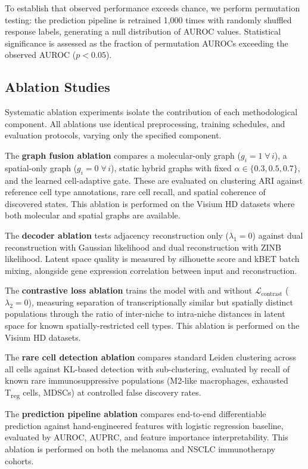 \documentclass{article}
\begin{document}
To establish that observed performance exceeds chance, we perform permutation testing: the prediction pipeline is retrained 1{,}000 times with randomly shuffled response labels, generating a null distribution of AUROC values. Statistical significance is assessed as the fraction of permutation AUROCs exceeding the observed AUROC ($p < 0.05$).


\subsection{Ablation Studies}
\label{sec:ablations}

Systematic ablation experiments isolate the contribution of each methodological component. All ablations use identical preprocessing, training schedules, and evaluation protocols, varying only the specified component.

The \textbf{graph fusion ablation} compares a molecular-only graph ($g_i = 1 \;\forall\, i$), a spatial-only graph ($g_i = 0 \;\forall\, i$), static hybrid graphs with fixed $\alpha \in \{0.3, 0.5, 0.7\}$, and the learned cell-adaptive gate. These are evaluated on clustering ARI against reference cell type annotations, rare cell recall, and spatial coherence of discovered states. This ablation is performed on the Visium HD datasets where both molecular and spatial graphs are available.

The \textbf{decoder ablation} tests adjacency reconstruction only ($\lambda_1 = 0$) against dual reconstruction with Gaussian likelihood and dual reconstruction with ZINB likelihood. Latent space quality is measured by silhouette score and kBET batch mixing, alongside gene expression correlation between input and reconstruction.

The \textbf{contrastive loss ablation} trains the model with and without $\mathcal{L}_{\text{contrast}}$ ($\lambda_2 = 0$), measuring separation of transcriptionally similar but spatially distinct populations through the ratio of inter-niche to intra-niche distances in latent space for known spatially-restricted cell types. This ablation is performed on the Visium HD datasets.

The \textbf{rare cell detection ablation} compares standard Leiden clustering across all cells against KL-based detection with sub-clustering, evaluated by recall of known rare immunosuppressive populations (M2-like macrophages, exhausted T\textsubscript{reg} cells, MDSCs) at controlled false discovery rates.

The \textbf{prediction pipeline ablation} compares end-to-end differentiable prediction against hand-engineered features with logistic regression baseline, evaluated by AUROC, AUPRC, and feature importance interpretability. This ablation is performed on both the melanoma and NSCLC immunotherapy cohorts.
\end{document}
